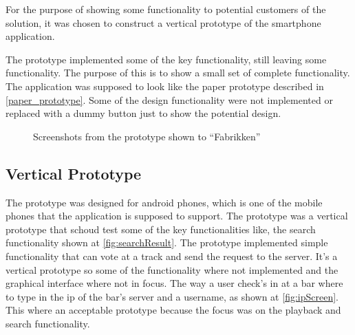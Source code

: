 For the purpose of showing some functionality to potential customers of the solution, it was chosen to construct a vertical prototype of the smartphone application.

The prototype implemented some of the key functionality, still leaving some functionality. The purpose of this is to show a small set of complete functionality. The application was supposed to look like the paper prototype described in \cref{paper_prototype}. Some of the design functionality were not implemented or replaced with a dummy button just to show the potential design.

\begin{figure}[hbtp]
  \centering
  \caption{Screenshots from the prototype shown to \enquote{Fabrikken}}
\end{figure}

\subsection{Vertical Prototype}
\label{sub:vertical_prototype}
The prototype was designed for android phones, which is one of the mobile phones that the application is supposed to support. The prototype was a vertical prototype that schoud test some of the key functionalities like, the search functionality shown at \cref{fig:searchResult}. The prototype implemented simple functionality that can vote at a track and send the request to the server. 
It's a vertical prototype so some of the functionality where not implemented and the graphical interface where not in focus. The way a user check's in at a bar where to type in the ip of the bar's server and a username, as shown at \cref{fig:ipScreen}. This where an acceptable prototype because the focus was on the playback and search functionality.
